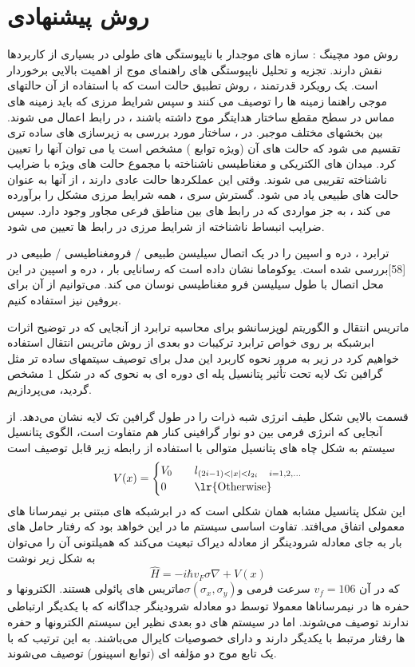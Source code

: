 \chapter{روش پیشنهادی}
\clearpage

روش مود مچینگ :
سازه های موجدار با ناپیوستگی های طولی در بسیاری از کاربردها نقش دارند. تجزیه و تحلیل ناپیوستگی های راهنمای موج از اهمیت بالایی برخوردار است. یک رویکرد قدرتمند ، روش تطبیق حالت  است که با استفاده از آن حالتهای موجی راهنما زمینه ها را توصیف می کنند و سپس شرایط مرزی که باید زمینه های مماس در سطح مقطع ساختار هدایتگر موج داشته باشند ، در رابط اعمال می شوند. بین بخشهای مختلف موجبر. در  ، ساختار مورد بررسی به زیرسازی های ساده تری تقسیم می شود که حالت های آن (ویژه توابع ) مشخص است یا می توان آنها را تعیین کرد. میدان های الکتریکی و مغناطیسی ناشناخته با مجموع حالت های ویژه با ضرایب ناشناخته تقریبی می شوند. وقتی این عملکردها حالت عادی دارند ، از آنها به عنوان حالت های طبیعی یاد می شود. گسترش سری ، همه شرایط مرزی مشکل را برآورده می کند ، به جز مواردی که در رابط های بین مناطق فرعی مجاور وجود دارد. سپس ضرایب انبساط ناشناخته از شرایط مرزی در رابط ها تعیین می شود.

ترابرد ، دره و اسپین را در یک اتصال سیلیسن طبیعی / فرومغناطیسی / طبیعی در [58]بررسی شده است. یوکوماما نشان داده است که رسانایی بار ، دره و اسپین در این محل اتصال با طول سیلیسن فرو مغناطیسی نوسان می کند. می‌توانیم از آن برای بروفین نیز استفاده کنیم.

ماتریس انتقال و الگوریتم لوپزسانشو برای محاسبه ترابرد
از آنجایی که در توضیح اثرات ابرشبکه بر روی خواص ترابرد ترکیبات دو بعدی از روش ماتریس انتقال استفاده خواهیم کرد در زیر به مرور نحوه کاربرد این مدل برای توصیف سیتمهای ساده تر مثل گرافین تک لایه تحت تأثیر پتانسیل پله ای دوره ای به نحوی که در شکل 1 مشخص گردید، می‌پردازیم.

قسمت بالایی شکل طیف انرژی شبه ذرات را در طول گرافین تک لایه نشان می‌دهد. از آنجایی که انرژی فرمی بین دو نوار گرافینی کنار هم متفاوت است، الگوی پتانسیل سیستم به شکل چاه های پتانسیل متوالی با استفاده از رابطه زیر قابل توصیف است
$$
V(x) = \begin{cases}
    V_0 &\quad l_{(2i-1)< |x| < l_{2i}\quad i=1,2,\dots}\\
    0 &\quad\text{\lr{Otherwise}}
\end{cases}
$$
این شکل پتانسیل مشابه همان شکلی است که در ابرشبکه های مبتنی بر نیمرسانا های معمولی اتفاق می‌افتد. تفاوت اساسی سیستم ما در این خواهد بود که رفتار حامل های بار به جای معادله شرودینگر از معادله دیراک تبعیت می‌کند که همیلتونی آن را می‌توان به شکل زیر نوشت
$$
\hat{H} = -i\hbar v_F\sigma \nabla + V(x)
$$
که در آن $v_f = 106$  سرعت فرمی و$\sigma(\sigma_x,\sigma_y)$ماتریس های پائولی هستند. الکترونها و حفره ها در نیمرساناها معمولا توسط دو معادله شرودینگر جداگانه که با یکدیگر ارتباطی ندارند توصیف می‌شوند. اما در سیستم های دو بعدی نظیر این سیستم الکترونها و حفره ها رفتار مرتبط با یکدیگر دارند و دارای خصوصیات کایرال می‌باشند. به این ترتیب که با یک تابع موج دو مؤلفه ای (توابع اسپینور) توصیف می‌شوند.

